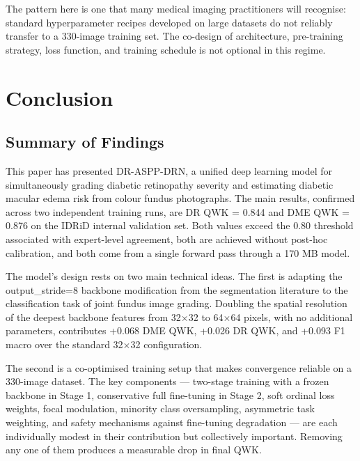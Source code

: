 \documentclass[12pt,a4paper]{article}
\begin{document}
The pattern here is one that many medical imaging practitioners will recognise: standard hyperparameter recipes developed on large datasets do not reliably transfer to a 330-image training set. The co-design of architecture, pre-training strategy, loss function, and training schedule is not optional in this regime.


\section{Conclusion}

\subsection{Summary of Findings}

This paper has presented DR-ASPP-DRN, a unified deep learning model for simultaneously grading diabetic retinopathy severity and estimating diabetic macular edema risk from colour fundus photographs. The main results, confirmed across two independent training runs, are DR QWK = 0.844 and DME QWK = 0.876 on the IDRiD internal validation set. Both values exceed the 0.80 threshold associated with expert-level agreement, both are achieved without post-hoc calibration, and both come from a single forward pass through a 170 MB model.

The model's design rests on two main technical ideas. The first is adapting the output\_stride=8 backbone modification from the segmentation literature to the classification task of joint fundus image grading. Doubling the spatial resolution of the deepest backbone features from 32$\times$32 to 64$\times$64 pixels, with no additional parameters, contributes +0.068 DME QWK, +0.026 DR QWK, and +0.093 F1 macro over the standard 32$\times$32 configuration.

The second is a co-optimised training setup that makes convergence reliable on a 330-image dataset. The key components --- two-stage training with a frozen backbone in Stage 1, conservative full fine-tuning in Stage 2, soft ordinal loss weights, focal modulation, minority class oversampling, asymmetric task weighting, and safety mechanisms against fine-tuning degradation --- are each individually modest in their contribution but collectively important. Removing any one of them produces a measurable drop in final QWK.
\end{document}
